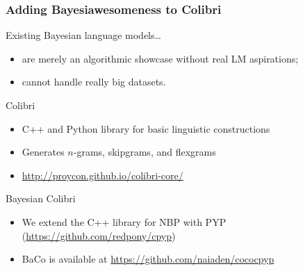 \begin{frame}
    \frametitle{Adding Bayesiawesomeness to Colibri}
    
    Existing Bayesian language models\ldots
        \begin{itemize}
            \item are merely an algorithmic showcase without real LM aspirations;
            \item cannot handle really big datasets.
        \end{itemize}

    \begin{block}{Colibri}
        \begin{itemize}
            \item C++ and Python library for basic linguistic constructions
            \item Generates $n$-grams, skipgrams, and flexgrams
            \item \url{http://proycon.github.io/colibri-core/}
        \end{itemize}
    \end{block}
    \vspace{-0.25cm}
    \begin{block}{Bayesian Colibri}
        \begin{itemize}
            \item We extend the C++ library for NBP with PYP (\url{https://github.com/redpony/cpyp})
            \item BaCo is available at \url{https://github.com/naiaden/cococpyp}
        \end{itemize}
    \end{block}
\end{frame}

